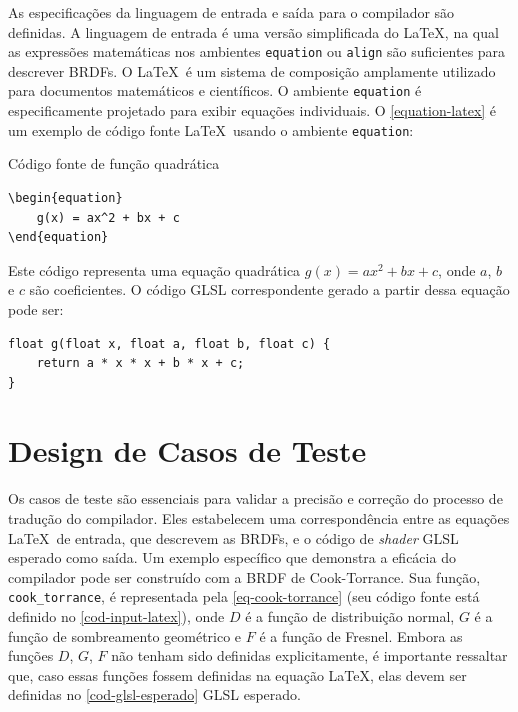 \documentclass[english, 
               brazil, 
               bsc] %
               {dcomp-abntex2}
\begin{document}
As especificações da linguagem de entrada e saída para o compilador são definidas. A linguagem de entrada é uma versão simplificada do \LaTeX, na qual as expressões matemáticas nos ambientes \texttt{equation} ou \texttt{align} são suficientes para descrever BRDFs. O \LaTeX\  é um sistema de composição amplamente utilizado para documentos matemáticos e científicos. O ambiente \texttt{equation} é especificamente projetado para exibir equações individuais. O \autoref{equation-latex} é um exemplo de código fonte \LaTeX\  usando o ambiente \texttt{equation}:


\begin{codigo}[H]
\caption{Código fonte de função quadrática}
\label{equation-latex}
\begin{lstlisting}
\begin{equation}
    g(x) = ax^2 + bx + c
\end{equation}
\end{lstlisting}
\end{codigo}




Este código representa uma equação quadrática \( g(x) = ax^2 + bx + c \), onde \( a \), \( b \) e \( c \) são coeficientes. O código GLSL correspondente gerado a partir dessa equação pode ser:  
\begin{verbatim}
float g(float x, float a, float b, float c) {
    return a * x * x + b * x + c;
}
\end{verbatim}


\section{Design de Casos de Teste} \label{testes}


Os casos de teste são essenciais para validar a precisão e correção do processo de tradução do compilador. Eles estabelecem uma correspondência entre as equações \LaTeX\ de entrada, que descrevem as BRDFs, e o código de \textit{shader} GLSL esperado como saída. Um exemplo específico que demonstra a eficácia do compilador pode ser construído com a BRDF de Cook-Torrance. Sua função, \texttt{cook\_torrance}, é representada pela \autoref{eq-cook-torrance} (seu código fonte está definido no \autoref{cod-input-latex}), onde \(D\) é a função de distribuição normal, \(G\) é a função de sombreamento geométrico e \(F\) é a função de Fresnel. Embora as funções \(D\), \(G\), \(F\) não tenham sido definidas explicitamente, é importante ressaltar que, caso essas funções fossem definidas na equação \LaTeX, elas devem ser definidas no \autoref{cod-glsl-esperado} GLSL esperado.  
\end{document}
